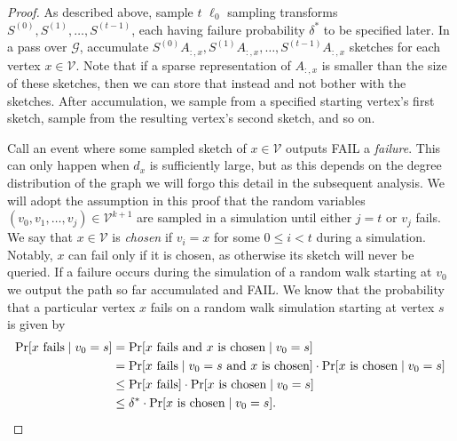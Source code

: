 \documentclass{report}
\begin{document}
\begin{proof}
As described above, sample $t$ $\ell_0$ sampling transforms $S^{(0)}, S^{(1)}, \dots, S^{(t-1)}$, each having failure probability $\delta^*$ to be specified later.
In a pass over $\mathcal{G}$, accumulate $S^{(0)}A_{:,x}, S^{(1)}A_{:,x}, \dots, S^{(t-1)}A_{:,x}$ sketches for each vertex $x \in \mathcal{V}$.
Note that if a sparse representation of $A_{:,x}$ is smaller than the size of these sketches, then we can store that instead and not bother with the sketches. 
After accumulation, we sample from a specified starting vertex's first sketch, sample from the resulting vertex's second sketch, and so on. 

Call an event where some sampled sketch of $x \in \mathcal{V}$ outputs FAIL a \emph{failure}. 
This can only happen when $d_x$ is sufficiently large, but as this depends on the degree distribution of the graph we will forgo this detail in the subsequent analysis.
We will adopt the assumption in this proof that the random variables $(v_0, v_1, \dots, v_j) \in \mathcal{V}^{k+1}$ are sampled in a simulation until either $j = t$ or $v_j$ fails.
We say that $x \in \mathcal{V}$ is \emph{chosen} if $v_i = x$ for some $0 \leq i < t$ during a simulation.
Notably, $x$ can fail only if it is chosen, as otherwise its sketch will never be queried.
If a failure occurs during the simulation of a random walk starting at $v_0$ we output the path so far accumulated and FAIL. 
We know that the probability that a particular vertex $x$ fails on a random walk simulation starting at vertex $s$ is given by
%
\begin{align}
\nonumber
\Pr [\textnormal{$x$ fails} \mid v_0 = s ]
&=
\Pr [\textnormal{$x$ fails and $x$ is chosen} \mid v_0 = s ]
\\
\nonumber
&=
\Pr [\textnormal{$x$ fails} \mid \textnormal{$v_0 = s$ and $x$ is chosen} ] \cdot \Pr [\textnormal{$x$ is chosen} \mid v_0 = s ]
\\
\nonumber
&\leq
\Pr [\textnormal{$x$ fails}] \cdot \Pr [\textnormal{$x$ is chosen} \mid v_0 = s ]
\\
\label{eq:sample:fail:prob}
&\leq
\delta^* \cdot \Pr [\textnormal{$x$ is chosen} \mid v_0 = s ].
\end{align}


\end{proof}
\end{document}
